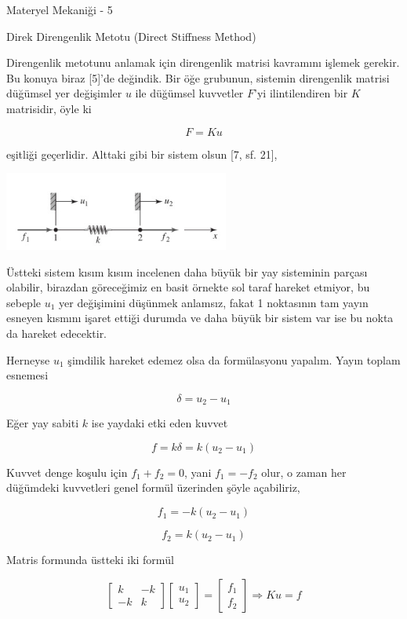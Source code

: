 \documentclass[12pt,fleqn]{article}\usepackage{../../common}
\begin{document}
Materyel Mekaniği - 5

Direk Direngenlik Metotu (Direct Stiffness Method)

Direngenlik metotunu anlamak için direngenlik matrisi kavramını işlemek
gerekir. Bu konuya biraz [5]'de değindik. Bir öğe grubunun, sistemin direngenlik
matrisi düğümsel yer değişimler $u$ ile düğümsel kuvvetler $F$'yi ilintilendiren
bir $K$ matrisidir, öyle ki

$$
F = K u
$$

eşitliği geçerlidir. Alttaki gibi bir sistem olsun [7, sf. 21],

\includegraphics[width=20em]{phy_020_strs_02_01.jpg}

Üstteki sistem kısım kısım incelenen daha büyük bir yay sisteminin parçası
olabilir, birazdan göreceğimiz en basit örnekte sol taraf hareket etmiyor, bu
sebeple $u_1$ yer değişimini düşünmek anlamsız, fakat 1 noktasının tam yayın
esneyen kısmını işaret ettiği durumda ve daha büyük bir sistem var ise bu nokta
da hareket edecektir.

Herneyse $u_1$ şimdilik hareket edemez olsa da formülasyonu yapalım. Yayın
toplam esnemesi

$$
\delta = u_2 - u_1
$$

Eğer yay sabiti $k$ ise yaydaki etki eden kuvvet

$$
f = k \delta = k (u_2 - u_1)
$$

Kuvvet denge koşulu için $f_1 + f_2  = 0$, yani $f_1 = -f_2$ olur, o zaman
her düğümdeki kuvvetleri genel formül üzerinden şöyle açabiliriz,

$$
f_1 = -k (u_2 - u_1)
$$

$$
f_2 = k(u_2 - u_1)
$$

Matris formunda üstteki iki formül

$$
\left[\begin{array}{cc}
k & -k \\ -k & k
\end{array}\right]
\left[\begin{array}{c}
u_1 \\ u_2 
\end{array}\right] =
\left[\begin{array}{c}
f_1 \\ f_2 
\end{array}\right]  \Rightarrow
Ku = f
$$
\end{document}
